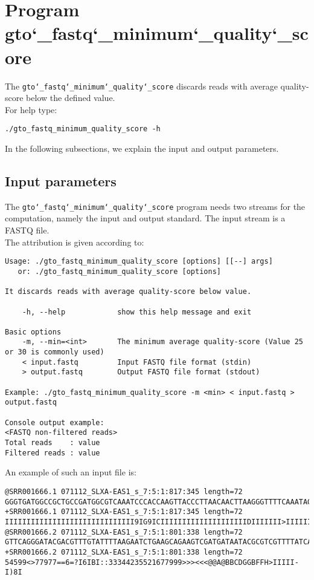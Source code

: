 \section{Program gto\char`_fastq\char`_minimum\char`_quality\char`_score}
The \texttt{gto\char`_fastq\char`_minimum\char`_quality\char`_score} discards reads with average quality-score below the defined value.\\
For help type:
\begin{lstlisting}
./gto_fastq_minimum_quality_score -h
\end{lstlisting}
In the following subsections, we explain the input and output parameters.

\subsection*{Input parameters}

The \texttt{gto\char`_fastq\char`_minimum\char`_quality\char`_score} program needs two streams for the computation, namely the input and output standard. The input stream is a FASTQ file.\\
The attribution is given according to:
\begin{lstlisting}
Usage: ./gto_fastq_minimum_quality_score [options] [[--] args]
   or: ./gto_fastq_minimum_quality_score [options]

It discards reads with average quality-score below value.

    -h, --help            show this help message and exit

Basic options
    -m, --min=<int>       The minimum average quality-score (Value 25 or 30 is commonly used)
    < input.fastq         Input FASTQ file format (stdin)
    > output.fastq        Output FASTQ file format (stdout)

Example: ./gto_fastq_minimum_quality_score -m <min> < input.fastq > output.fastq

Console output example:
<FASTQ non-filtered reads>
Total reads    : value
Filtered reads : value
\end{lstlisting}
An example of such an input file is:
\begin{lstlisting}
@SRR001666.1 071112_SLXA-EAS1_s_7:5:1:817:345 length=72
GGGTGATGGCCGCTGCCGATGGCGTCAAATCCCACCAAGTTACCCTTAACAACTTAAGGGTTTTCAAATAGA
+SRR001666.1 071112_SLXA-EAS1_s_7:5:1:817:345 length=72
IIIIIIIIIIIIIIIIIIIIIIIIIIIIII9IG9ICIIIIIIIIIIIIIIIIIIIIDIIIIIII>IIIIII/
@SRR001666.2 071112_SLXA-EAS1_s_7:5:1:801:338 length=72
GTTCAGGGATACGACGTTTGTATTTTAAGAATCTGAAGCAGAAGTCGATGATAATACGCGTCGTTTTATCAT
+SRR001666.2 071112_SLXA-EAS1_s_7:5:1:801:338 length=72
54599<>77977==6=?I6IBI::33344235521677999>>><<<@@A@BBCDGGBFFH>IIIII-I)8I
\end{lstlisting}

